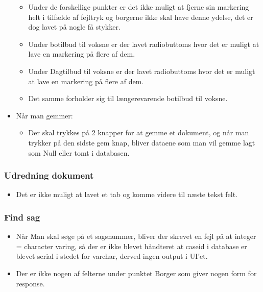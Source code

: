 \begin{itemize}
\begin{itemize}
\item Under de forskellige punkter er det ikke muligt at fjerne sin markering helt i tilfælde af fejltryk og borgerne ikke skal have denne ydelse, det er dog lavet på nogle få stykker.
\item Under botilbud til voksne er der lavet radiobuttoms hvor det er muligt at lave en markering på flere af dem.
\item Under Dagtilbud til voksne er der lavet radiobuttoms hvor det er muligt at lave en markering på flere af dem.
\item Det samme forholder sig til længerevarende botilbud til voksne.
\end{itemize}
\item Når man gemmer:
\begin{itemize}
\item Der skal trykkes på 2 knapper for at gemme et dokument, og når man trykker på den sidste gem knap, bliver dataene som man vil gemme lagt som Null eller tomt i databasen.
\end{itemize}
\end{itemize}
\subsubsection{Udredning dokument}
\begin{itemize}
\item Det er ikke muligt at lavet et tab og komme videre til næste tekst felt.
\end{itemize}
\subsubsection{Find sag}
\begin{itemize}
\item Når Man skal søge på et sagsnummer, bliver der skrevet en fejl på at integer = character varing, så der er ikke blevet håndteret at caseid i database er blevet serial i stedet for varchar, derved ingen output i UI’et.
\item Der er ikke nogen af felterne under punktet Borger som giver nogen form for response.
\end{itemize}
